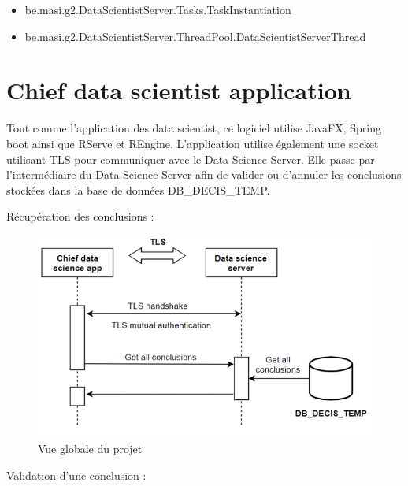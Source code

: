 \begin{itemize}
    \item be.masi.g2.DataScientistServer.Tasks.TaskInstantiation
    \item be.masi.g2.DataScientistServer.ThreadPool.DataScientistServerThread
\end{itemize}

\section{Chief data scientist application}

Tout comme l'application des data scientist, ce logiciel utilise JavaFX, Spring boot ainsi que RServe et
REngine. L'application utilise également une socket utilisant TLS pour communiquer avec le Data
Science Server.
Elle passe par l'intermédiaire du Data Science Server afin de valider ou d'annuler les conclusions
stockées dans la base de données DB\_DECIS\_TEMP.

Récupération des conclusions :

\begin{figure}[H]
    \centering
    \includegraphics[width=\textwidth]{./img/thibault-DataScientistApp_2.png}
    \caption{Vue globale du projet}
    \label{fig:thibault-chief-app-retrieve}
\end{figure}

Validation d'une conclusion :


